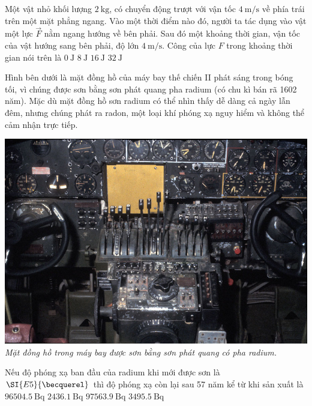\begin{ex}
	Một vật nhỏ khối lượng $\SI{2}{\kilogram}$, có chuyển động trượt với vận tốc $\SI{4}{\meter/\second}$ về phía trái trên một mặt phẳng ngang. Vào một thời điểm nào đó, người ta tác dụng vào vật một lực $\vec{F}$ nằm ngang hướng về bên phải. Sau đó một khoảng thời gian, vận tốc của vật hướng sang bên phải, độ lớn $\SI{4}{\meter/\second}$. Công của lực $F$ trong khoảng thời gian nói trên là
	\choice
	{\True$\SI{0}{\joule}$}
	{$\SI{8}{\joule}$}
	{$\SI{16}{\joule}$}
	{$\SI{32}{\joule}$}
\end{ex}
\begin{ex}
	Hình bên dưới là mặt đồng hồ của máy bay thế chiến II phát sáng trong bóng tối, vì chúng được sơn bằng sơn phát quang pha radium (có chu kì bán rã 1602 năm). Mặc dù mặt đồng hồ sơn radium có thể nhìn thấy dễ dàng cả ngày lẫn đêm, nhưng chúng phát ra radon, một loại khí phóng xạ nguy hiểm và không thể cảm nhận trực tiếp. 
	\begin{center}
		\includegraphics[width=0.4\linewidth]{../figs/BThatnhan-4}\\
		\textit{Mặt đồng hồ trong máy bay được sơn bằng sơn phát quang có pha radium.}
	\end{center}
	Nếu độ phóng xạ ban đầu của radium khi mới được sơn là $\SI{E5}{\becquerel}$ thì độ phóng xạ còn lại sau 57 năm kể từ khi sản xuất là
	\choice
	{$\SI{96504.5}{\becquerel}$}
	{$\SI{2436.1}{\becquerel}$}
	{\True $\SI{97563.9}{\becquerel}$}
	{$\SI{3495.5}{\becquerel}$}
\end{ex}
